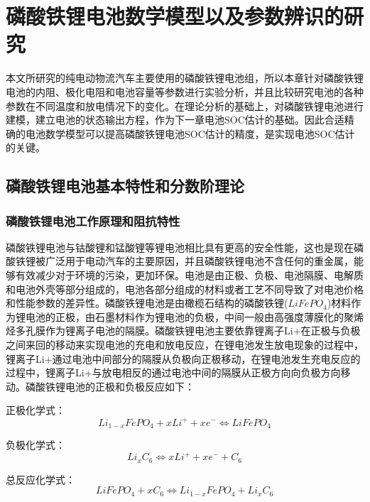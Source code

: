 
\chapter{磷酸铁锂电池数学模型以及参数辨识的研究}
本文所研究的纯电动物流汽车主要使用的磷酸铁锂电池组，所以本章针对磷酸铁锂电池的内阻、极化电阻和电池容量等参数进行实验分析，并且比较研究电池的各种参数在不同温度和放电情况下的变化。在理论分析的基础上，对磷酸铁锂电池进行建模，建立电池的状态输出方程，作为下一章电池SOC估计的基础。因此合适精确的电池数学模型可以提高磷酸铁锂电池SOC估计的精度，是实现电池SOC估计的关键。
\section{磷酸铁锂电池基本特性和分数阶理论}
\subsection{磷酸铁锂电池工作原理和阻抗特性}
磷酸铁锂电池与钴酸锂和锰酸锂等锂电池相比具有更高的安全性能，这也是现在磷酸铁锂被广泛用于电动汽车的主要原因，并且磷酸铁锂电池不含任何的重金属，能够有效减少对于环境的污染，更加环保。电池是由正极、负极、电池隔膜、电解质和电池外壳等部分组成的，电池各部分组成的材料或者工艺不同导致了对电池价格和性能参数的差异性。磷酸铁锂电池是由橄榄石结构的磷酸铁锂($LiFeP{O_4}$)材料作为锂电池的正极，由石墨材料作为锂电池的负极，中间一般由高强度薄膜化的聚烯烃多孔膜作为锂离子电池的隔膜。磷酸铁锂电池主要依靠锂离子Li+在正极与负极之间来回的移动来实现电池的充电和放电反应，在锂电池发生放电现象的过程中，锂离子Li+通过电池中间部分的隔膜从负极向正极移动，在锂电池发生充电反应的过程中，锂离子Li+与放电相反的通过电池中间的隔膜从正极方向向负极方向移动。磷酸铁锂电池的正极和负极反应如下：

正极化学式：
\begin{equation}
L{i_{1 - x}}FeP{O_4} + xL{i^ + } + x{e^ - } \Leftrightarrow LiFeP{O_4}
\end{equation}

负极化学式：
\begin{equation}
L{i_x}{C_6} \Leftrightarrow xL{i^ + } + x{e^ - } + {C_6}
\end{equation}

总反应化学式：
\begin{equation}
LiFeP{O_4} + x{C_6} \Leftrightarrow L{i_{1 - x}}FeP{O_4} + L{i_x}{C_6}
\end{equation}

